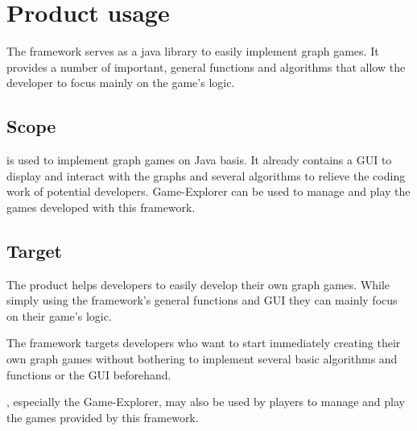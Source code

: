 \section{Product usage}
The \gls{framework} serves as a \Gls{java} \gls{library} to easily implement \gls{graph} \glspl{game}. It provides a number of important, general functions and \glspl{algorithm} that allow the \gls{developer} to focus mainly on the game's logic.

\subsection{Scope}
{\graphioli} is used to implement graph games on Java basis. It already contains a \gls{GUI} to display and interact with the graphs and several algorithms to relieve the coding work of potential developers. {\graphioli} Game-Explorer can be used to manage and play the games developed with this framework.

\subsection{Target}
The product helps developers to easily develop their own graph games. While simply using the framework's general functions and GUI they can mainly focus on their game's logic. \par
The framework targets developers who want to start immediately creating their own graph games without bothering to implement several basic algorithms and functions or the GUI beforehand. \par
{\graphioli}, especially the Game-Explorer, may also be used by \glspl{player} to manage and play the games provided by this framework.
